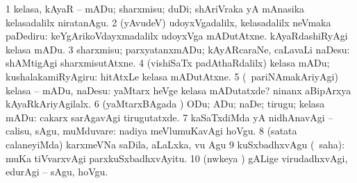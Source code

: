 \noindent
\gl{\akirx}
\expl{}
\bmng
\bnum
\num{1} kelasa, kAyaR -- mADu; sharxmisu; duDi; shAriVraka yA mAnasika kelasadalilx niratanAgu. 
\num{2} (yAvudeV) udoyxVgadalilx, kelasadalilx neVmaka paDediru:  keYgArikoVdayxmadalilx udoyxVga mADutAtxne.  kAyaRdashiRyAgi kelasa mADu. 
\num{3} sharxmisu; parxyatanxmADu; kAyARcaraNe, caLavaLi naDesu:  shAMtigAgi sharxmisutAtxne. 
\num{4} (vishiSaTx padAthaRdalilx) kelasa mADu; kushalakamiRyAgiru:  hitAtxLe kelasa mADutAtxne. 
\num{5} (\kanmu\ pariNAmakAriyAgi) kelasa -- mADu, naDesu:  yaMtarx heVge kelasa mADutatxde?  ninanx aBipArxya kAyaRkAriyAgilalx. 
\num{6} (yaMtarxBAgada \vi) ODu; ADu; naDe; tirugu; kelasa mADu:  cakarx sarAgavAgi tirugutatxde. 
\num{7} kaSaTxdiMda yA nidhAnavAgi -- calisu, sAgu, muMduvare:  nadiya meVlumuKavAgi hoVgu. 
\num{8} (satata calaneyiMda) karxmeVNa saDila, aLaLxka, \mo vu Agu 
\num{9} kuSxbadhxvAgu (\rUpa\ saha):  muKa tiVvarxvAgi parxkuSxbadhxvAyitu. 
\num{10} (nwkeya \vi) gALige virudadhxvAgi, edurAgi -- sAgu, hoVgu. 
\enum
\emng

